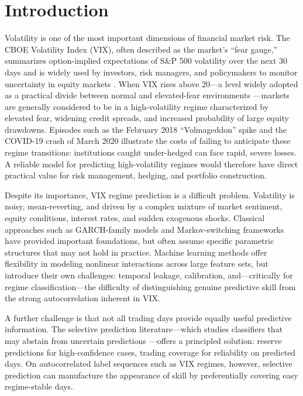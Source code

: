 \documentclass[12pt]{article}
\begin{document}
\tableofcontents
\newpage

\section{Introduction}

Volatility is one of the most important dimensions of financial market risk. The CBOE Volatility Index (VIX), often described as the market's ``fear gauge,'' summarizes option-implied expectations of S\&P 500 volatility over the next 30 days and is widely used by investors, risk managers, and policymakers to monitor uncertainty in equity markets \citep{whaley2009}. When VIX rises above 20---a level widely adopted as a practical divide between normal and elevated-fear environments \citep{whaley2009}---markets are generally considered to be in a high-volatility regime characterized by elevated fear, widening credit spreads, and increased probability of large equity drawdowns. Episodes such as the February 2018 ``Volmageddon'' spike and the COVID-19 crash of March 2020 illustrate the costs of failing to anticipate these regime transitions: institutions caught under-hedged can face rapid, severe losses. A reliable model for predicting high-volatility regimes would therefore have direct practical value for risk management, hedging, and portfolio construction.

Despite its importance, VIX regime prediction is a difficult problem. Volatility is noisy, mean-reverting, and driven by a complex mixture of market sentiment, equity conditions, interest rates, and sudden exogenous shocks. Classical approaches such as GARCH-family models \citep{bollerslev1986} and Markov-switching frameworks \citep{hamilton1989} have provided important foundations, but often assume specific parametric structures that may not hold in practice. Machine learning methods offer flexibility in modeling nonlinear interactions across large feature sets, but introduce their own challenges: temporal leakage, calibration, and---critically for regime classification---the difficulty of distinguishing genuine predictive skill from the strong autocorrelation inherent in VIX.

A further challenge is that not all trading days provide equally useful predictive information. The selective prediction literature---which studies classifiers that may abstain from uncertain predictions \citep{chow1970, bartlett2008, geifman2017}---offers a principled solution: reserve predictions for high-confidence cases, trading coverage for reliability on predicted days. On autocorrelated label sequences such as VIX regimes, however, selective prediction can manufacture the appearance of skill by preferentially covering easy regime-stable days.
\end{document}
